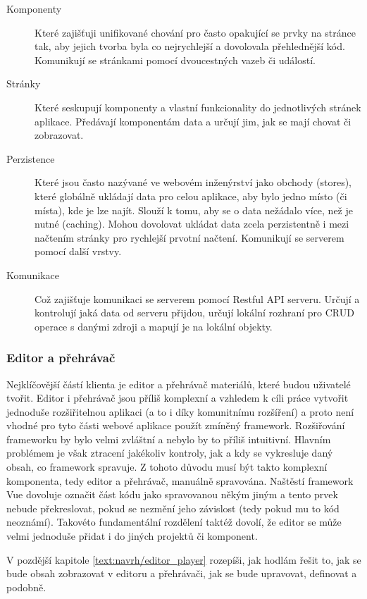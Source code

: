 \begin{description}
    \item[Komponenty] Které zajišťuji unifikované chování pro často opakující se prvky na stránce tak, aby jejich tvorba byla co nejrychlejší a dovolovala přehlednější kód. Komunikují se stránkami pomocí dvoucestných vazeb či událostí.
    \item[Stránky] Které seskupují komponenty a vlastní funkcionality do jednotlivých stránek aplikace. Předávají komponentám data a určují jim, jak se mají chovat či zobrazovat.
    \item[Perzistence] Které jsou často nazývané ve webovém inženýrství jako obchody (stores), které globálně ukládají data pro celou aplikace, aby bylo jedno místo (či místa), kde je lze najít. Slouží k tomu, aby se o data nežádalo více, než je nutné (caching). Mohou dovolovat ukládat data zcela perzistentně i mezi načtením stránky pro rychlejší prvotní načtení. Komunikují se serverem pomocí další vrstvy.
    \item[Komunikace] Což zajišťuje komunikaci se serverem pomocí Restful API serveru. Určují a kontrolují jaká data od serveru přijdou, určují lokální rozhraní pro CRUD operace s danými zdroji a mapují je na lokální objekty.
\end{description}

\subsubsection{Editor a přehrávač}

Nejklíčovější částí klienta je editor a přehrávač materiálů, které budou uživatelé tvořit.
Editor i přehrávač jsou příliš komplexní a vzhledem k cíli práce vytvořit jednoduše rozšiřitelnou aplikaci (a to i díky komunitnímu rozšíření) a proto není vhodné pro tyto části webové aplikace použít zmíněný framework.
Rozšiřování frameworku by bylo velmi zvláštní a nebylo by to příliš intuitivní.
Hlavním problémem je však ztracení jakékoliv kontroly, jak a kdy se vykresluje daný obsah, co framework spravuje.
Z tohoto důvodu musí být takto komplexní komponenta, tedy editor a přehrávač, manuálně spravována.
Naštěstí framework Vue dovoluje označit část kódu jako spravovanou někým jiným a tento prvek nebude překreslovat, pokud se nezmění jeho závislost (tedy pokud mu to kód neoznámí). 
Takovéto fundamentální rozdělení taktéž dovolí, že editor se může velmi jednoduše přidat i do jiných projektů či komponent.

V pozdější kapitole \ref{text:navrh/editor_player} rozepíši, jak hodlám řešit to, jak se bude obsah zobrazovat v editoru a přehrávači, jak se bude upravovat, definovat a podobně.

